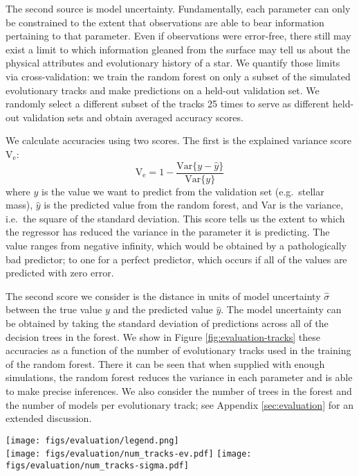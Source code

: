 \documentclass[manuscript]{aastex}
\begin{document}
The second source is model uncertainty. Fundamentally, each parameter can only be constrained to the extent that observations are able to bear information pertaining to that parameter. Even if observations were error-free, there still may exist a limit to which information gleaned from the surface may tell us about the physical attributes and evolutionary history of a star. We quantify those limits via cross-validation: we train the random forest on only a subset of the simulated evolutionary tracks and make predictions on a held-out validation set. We randomly select a different subset of the tracks 25 times to serve as different held-out validation sets and obtain averaged accuracy scores. 

We calculate accuracies using two scores. The first is the explained variance score V$_{\text{e}}$:
\begin{equation}
  \text{V}_{\text{e}} = 1 - \frac{\text{Var}\{ y - \hat y \}}{\text{Var}\{ y \}}
\end{equation}
where $y$ is the value we want to predict from the validation set (e.g.~stellar mass), $\hat y$ is the predicted value from the random forest, and Var is the variance, i.e.~the square of the standard deviation. This score tells us the extent to which the regressor has reduced the variance in the parameter it is predicting. The value ranges from negative infinity, which would be obtained by a pathologically bad predictor; to one for a perfect predictor, which occurs if all of the values are predicted with zero error. 

The second score we consider is the distance in units of model uncertainty $\hat \sigma$ between the true value $y$ and the predicted value $\hat y$. The model uncertainty can be obtained by taking the standard deviation of predictions across all of the decision trees in the forest. We show in Figure \ref{fig:evaluation-tracks} these accuracies as a function of the number of evolutionary tracks used in the training of the random forest. There it can be seen that when supplied with enough simulations, the random forest reduces the variance in each parameter and is able to make precise inferences. We also consider the number of trees in the forest and the number of models per evolutionary track; see Appendix \ref{sec:evaluation} for an extended discussion. 

\begin{figure*}
    \centering
    \texttt{[image: figs/evaluation/legend.png]}\\
    \texttt{[image: figs/evaluation/num\_tracks-ev.pdf]}\hfill
    \texttt{[image: figs/evaluation/num\_tracks-sigma.pdf]}
    \caption{Explained variance (left) and accuracy per precision score (right) of each stellar parameter as a function of the number of evolutionary tracks used in training the random forest. } 
    \label{fig:evaluation-tracks}
\end{figure*}
\end{document}
